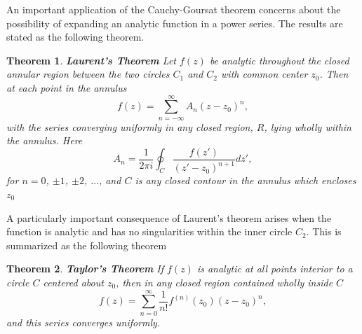 \documentclass[11pt, letterpaper]{article}
\newtheorem{thm}{Theorem}
\begin{document}
An important application of the Cauchy-Goursat theorem concerns about the possibility of expanding an analytic function
in a power series. The results are stated as the following theorem.
\begin{thm}
{\bf Laurent's Theorem} Let $f(z)$ be analytic throughout the closed annular region between the two circles $C_1$ and $C_2$
with common center $z_0$. Then at each point in the annulus
\begin{equation}
	f(z) = \sum_{n=-\infty}^{\infty} A_n(z-z_0)^n,
\end{equation}
with the series converging uniformly in any closed region, $R$, lying wholly within the annulus. Here
\begin{equation}
	A_n = \frac{1}{2\pi i}\oint_C\frac{f(z')}{(z'-z_0)^{n+1}}dz',
\end{equation}
for $n=0$, $\pm 1$, $\pm 2$, $\ldots$, and $C$ is any closed contour in the annulus which encloses $z_0$
\end{thm}
A particularly important consequence of Laurent's theorem arises when the function is analytic and has no singularities within
the inner circle $C_2$. This is summarized as the following theorem
\begin{thm}
{\bf Taylor's Theorem} If $f(z)$ is analytic at all points interior to a circle $C$ centered about $z_0$, then in any closed
region contained wholly inside $C$
\begin{equation}
	f(z) = \sum_{n=0}^{\infty}\frac{1}{n!}f^{(n)}(z_0)(z-z_0)^n,
\end{equation}
and this series converges uniformly.
\end{thm}
\end{document}
